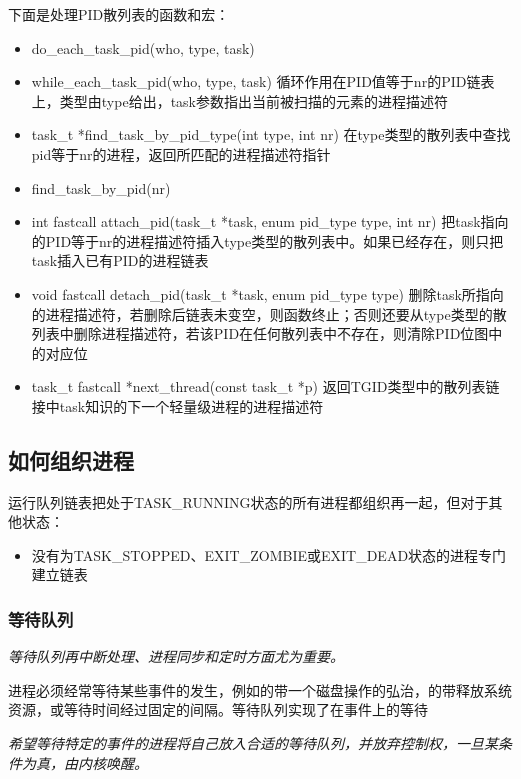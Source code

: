     下面是处理PID散列表的函数和宏：

\begin{itemize}
    \item do\_each\_task\_pid(who, type, task)
    \item while\_each\_task\_pid(who, type, task)
    \subitem 循环作用在PID值等于nr的PID链表上，类型由type给出，task参数指出当前被扫描的元素的进程描述符
    \item task\_t *find\_task\_by\_pid\_type(int type, int nr)
    \subitem 在type类型的散列表中查找pid等于nr的进程，返回所匹配的进程描述符指针
    \item find\_task\_by\_pid(nr)
    \item int fastcall attach\_pid(task\_t *task, enum pid\_type type, int nr)
    \subitem 把task指向的PID等于nr的进程描述符插入type类型的散列表中。如果已经存在，则只把task插入已有PID的进程链表
    \item void fastcall detach\_pid(task\_t *task, enum pid\_type type)
    \subitem 删除task所指向的进程描述符，若删除后链表未变空，则函数终止；否则还要从type类型的散列表中删除进程描述符，若该PID在任何散列表中不存在，则清除PID位图中的对应位
    \item task\_t fastcall *next\_thread(const task\_t *p)
    \subitem 返回TGID类型中的散列表链接中task知识的下一个轻量级进程的进程描述符
\end{itemize}

\subsection{如何组织进程}

    运行队列链表把处于TASK\_RUNNING状态的所有进程都组织再一起，但对于其他状态：

\begin{itemize}
    \item 没有为TASK\_STOPPED、EXIT\_ZOMBIE或EXIT\_DEAD状态的进程专门建立链表
\end{itemize}

\subsubsection{等待队列}    

    \emph{等待队列再中断处理、进程同步和定时方面尤为重要。}

    进程必须经常等待某些事件的发生，例如的带一个磁盘操作的弘治，的带释放系统资源，或等待时间经过固定的间隔。等待队列实现了在事件上的等待

    \emph{希望等待特定的事件的进程将自己放入合适的等待队列，并放弃控制权，一旦某条件为真，由内核唤醒。} 


